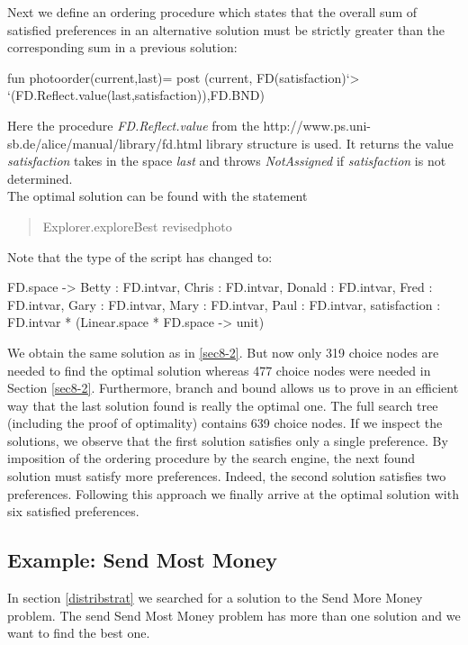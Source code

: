 \documentclass[a4paper]{scrartcl}
\begin{document}
Next we define an ordering procedure which states that the overall 
sum of satisfied preferences in an alternative solution must be 
strictly greater than the corresponding sum in a previous solution:\\
\begin{myverbatim}
fun photoorder(current,last)=
               post (current, FD(satisfaction)`> 
            `(FD.Reflect.value(last,satisfaction)),FD.BND)
\end{myverbatim}


Here the procedure {\it FD.Reflect.value} from the
\htmladdnormallink{\textcolor{blue}{FD.Reflect}}
{http://www.ps.uni-sb.de/alice/manual/library/fd.html}
library structure is used.
It returns the value {\it satisfaction} takes in the space {\it last} and
throws {\it NotAssigned} if {\it satisfaction} is not determined.\\
The optimal solution can be found with the statement
\begin{quote}
    Explorer.exploreBest revisedphoto
\end{quote}
Note that the type of the script has changed to:
\begin{myverbatim}
FD.space ->
      {Betty : FD.intvar, Chris : FD.intvar, Donald : FD.intvar,
       Fred : FD.intvar, Gary : FD.intvar, Mary : FD.intvar, Paul : FD.intvar,
       satisfaction : FD.intvar} * (Linear.space * FD.space -> unit)
\end{myverbatim}


We obtain the same solution as in \ref{sec8-2}. But now only 319 choice nodes 
are needed to find the optimal solution whereas 477 choice nodes 
were needed in Section \ref{sec8-2}. Furthermore, branch and bound allows 
us to prove in an efficient way that the last solution found is 
really the optimal one. The full search tree (including the proof 
of optimality) contains 639 choice nodes. If we inspect 
the solutions, we observe that the first solution satisfies only a 
single preference. By imposition of the ordering procedure by the 
search engine, the next found solution must satisfy more preferences. 
Indeed, the second solution satisfies two preferences. Following 
this approach we finally arrive at the optimal solution with six 
satisfied preferences.


\newpage
\subsection{Example: Send Most Money}
In section \ref{distribstrat} we searched for a solution to the
Send More Money problem. The send Send Most Money problem
has more than one solution and we want to find the best one.
\end{document}
